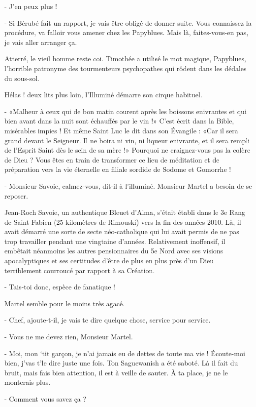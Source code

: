 - J’en peux plus !

- Si Bérubé fait un rapport, je vais être obligé de donner suite. Vous connaissez la procédure, va falloir vous amener chez les Papyblues. Mais là, faites-vous-en pas, je vais aller arranger ça.

Atterré, le vieil homme reste coi. Timothée a utilisé le mot magique, Papyblues, l’horrible patronyme des tourmenteurs psychopathes qui rôdent dans les dédales du sous-sol.

Hélas ! deux lits plus loin, l’Illuminé démarre son cirque habituel.

- «Malheur à ceux qui de bon matin courent après les boissons enivrantes et qui bien avant dans la nuit sont échauffés par le vin !» C’est écrit dans la Bible, misérables impies ! Et même Saint Luc le dit dans son Évangile : «Car il sera grand devant le Seigneur. Il ne boira ni vin, ni liqueur enivrante, et il sera rempli de l’Esprit Saint dès le sein de sa mère !» Pourquoi ne craignez-vous pas la colère de Dieu ? Vous êtes en train de transformer ce lieu de méditation et de préparation vers la vie éternelle en filiale sordide de Sodome et Gomorrhe !

- Monsieur Savoie, calmez-vous, dit-il à l’illuminé. Monsieur Martel a besoin de se reposer.

Jean-Roch Savoie, un authentique Bleuet d’Alma, s’était établi dans le 3e Rang de Saint-Fabien (25 kilomètres de Rimouski) vers la fin des années 2010. Là, il avait démarré une sorte de secte néo-catholique qui lui avait permis de ne pas trop travailler pendant une vingtaine d’années. Relativement inoffensif, il embêtait néanmoins les autres pensionnaires du 5e Nord avec ses visions apocalyptiques et ses certitudes d’être de plus en plus près d’un Dieu terriblement courroucé par rapport à sa Création.

- Tais-toi donc, espèce de fanatique !

Martel semble pour le moins très agacé.

- Chef, ajoute-t-il, je vais te dire quelque chose, service pour service.

- Vous ne me devez rien, Monsieur Martel.

- Moi, mon ‘tit garçon, je n’ai jamais eu de dettes de toute ma vie ! Écoute-moi bien, j’vas t’le dire juste une fois. Ton Saguewanish a été saboté. Là il fait du bruit, mais fais bien attention, il est à veille de sauter. À ta place, je ne le monterais plus.

- Comment vous savez ça ?

